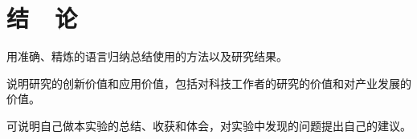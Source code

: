 \documentclass{thuemp}
\begin{document}
\section{结~~论}
用准确、精炼的语言归纳总结使用的方法以及研究结果。

说明研究的创新价值和应用价值，包括对科技工作者的研究的价值和对产业发展的价值。

可说明自己做本实验的总结、收获和体会，对实验中发现的问题提出自己的建议。



\renewcommand\refname{\heiti\wuhao\centerline{参考文献}\global\def\refname{参考文献}}
\vskip 12pt

\let\OLDthebibliography\thebibliography
\renewcommand\thebibliography[1]{
  \OLDthebibliography{#1}
  \setlength{\parskip}{0pt}
  \setlength{\itemsep}{0pt plus 0.3ex}
}

{
\renewcommand{\baselinestretch}{0.9}
\liuhao


}
\end{document}
